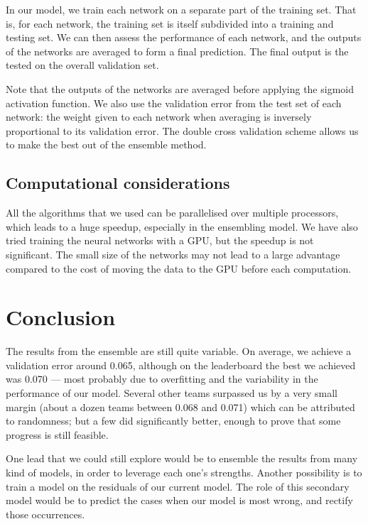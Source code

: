 \documentclass[a4paper,11pt,openany,extrafontsizes,oneside,article,twocolumn]{memoir}
\begin{document}
In our model, we train each network on a separate part of the training
set. That is, for each network, the training set is itself subdivided
into a training and testing set. We can then assess the performance of
each network, and the outputs of the networks are averaged to form a
final prediction.  The final output is the tested on the overall
validation set.

Note that the outputs of the networks are averaged before applying the
sigmoid activation function. We also use the validation error from the
test set of each network: the weight given to each network when
averaging is inversely proportional to its validation error. The
double cross validation scheme allows us to make the best out of the
ensemble method.

\section{Computational considerations}

All the algorithms that we used can be parallelised over multiple
processors, which leads to a huge speedup, especially in the
ensembling model. We have also tried training the neural networks with
a GPU, but the speedup is not significant. The small size of the
networks may not lead to a large advantage compared to the cost of
moving the data to the GPU before each computation.
    
    
\chapter{Conclusion}

The results from the ensemble are still quite variable. On average, we
achieve a validation error around 0.065, although on the leaderboard
the best we achieved was 0.070 --- most probably due to overfitting
and the variability in the performance of our model. Several other
teams surpassed us by a very small margin (about a dozen teams between
0.068 and 0.071) which can be attributed to randomness; but a few did
significantly better, enough to prove that some progress is still
feasible.

One lead that we could still explore would be to ensemble the results
from many kind of models, in order to leverage each one's
strengths. Another possibility is to train a model on the residuals of
our current model. The role of this secondary model would be to
predict the cases when our model is most wrong, and rectify those
occurrences.
\end{document}
